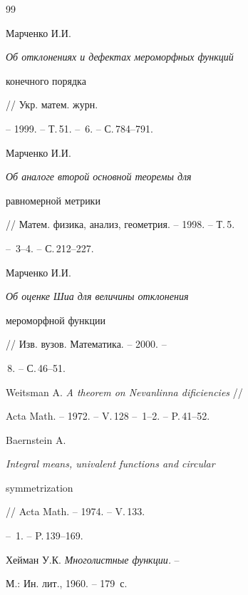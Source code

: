 \begin{thebibliography}{99}


Марченко И.И. {\it Об отклонениях и дефектах мероморфных функций


конечного порядка} // Укр. матем. журн.


-- 1999. -- Т.\,51. -- \No\,6. -- С.\,784--791.




Марченко И.И. {\it Об аналоге второй основной теоремы для


равномерной метрики} // Матем. физика, анализ, геометрия. -- 1998. -- Т.\,5.


-- \No\,3--4. -- С.\,212--227.




Марченко И.И. {\it Об оценке  Шиа для величины отклонения 


мероморфной функции} // Изв. вузов. Математика. -- 2000. --


\No\,8. -- С.\,46--51.




Weitsman A. {\it A theorem on Nevanlinna dificiencies} //


Acta Math. -- 1972. -- V.\,128 -- \No\,1--2. -- P.\,41--52.




Baernstein A. {\it Integral means, univalent functions and circular


symmetrization} // Acta Math. -- 1974. -- V.\,133.


-- \No\,1. -- P.\,139--169.




Хейман У.К. {\it Многолистные функции.} --


М.: Ин. лит., 1960. -- 179~с.





\end{thebibliography}





\vskip 2cm












\label{end}





